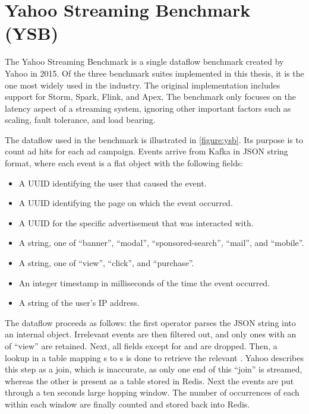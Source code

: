 \section{Yahoo Streaming Benchmark (YSB)}
The Yahoo Streaming Benchmark\cite{ysb} is a single dataflow benchmark created by Yahoo in 2015. Of the three benchmark suites implemented in this thesis, it is the one most widely used in the industry. The original implementation includes support for Storm, Spark, Flink, and Apex. The benchmark only focuses on the latency aspect of a streaming system, ignoring other important factors such as scaling, fault tolerance, and load bearing. \\


The dataflow used in the benchmark is illustrated in \autoref{figure:ysb}. Its purpose is to count ad hits for each ad campaign. Events arrive from Kafka in JSON string format, where each event is a flat object with the following fields:

\begin{itemize}
\item {} A UUID identifying the user that caused the event.
\item {} A UUID identifying the page on which the event occurred.
\item {} A UUID for the specific advertisement that was interacted with.
\item {} A string, one of ``banner'', ``modal'', ``sponsored-search'', ``mail'', and ``mobile''.
\item {} A string, one of ``view'', ``click'', and ``purchase''.
\item {} An integer timestamp in milliseconds of the time the event occurred.
\item {} A string of the user's IP address.
\end{itemize}

The dataflow proceeds as follows: the first operator parses the JSON string into an internal object. Irrelevant events are then filtered out, and only ones with an  of ``view'' are retained. Next, all fields except for  and  are dropped. Then, a lookup in a table mapping s to s is done to retrieve the relevant . Yahoo describes this step as a join, which is inaccurate, as only one end of this ``join'' is streamed, whereas the other is present as a table stored in Redis. Next the events are put through a ten seconds large hopping window. The number of occurrences of each  within each window are finally counted and stored back into Redis.


